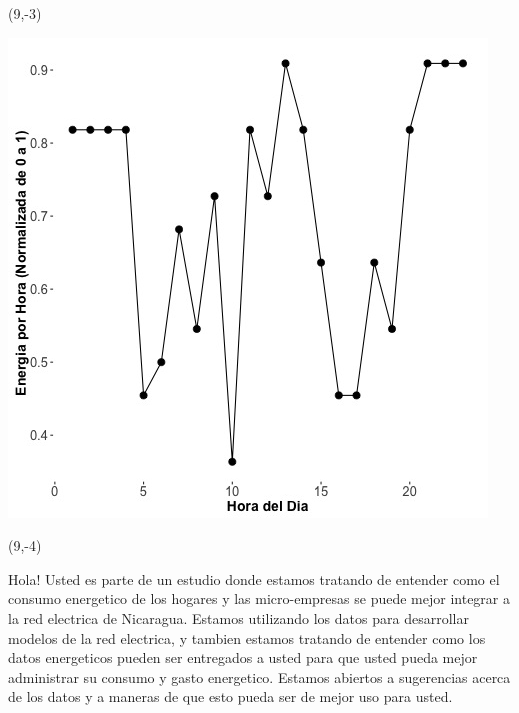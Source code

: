 \documentclass{article}\usepackage[]{graphicx}\usepackage[]{color}
\newenvironment{knitrout}{}{} %
\begin{document}
 \begin{textblock}{1}(9,-3)
\begin{minipage}{20em}
\begingroup

\endgroup
\end{minipage}
\end{textblock}

\begin{knitrout}
\color{fgcolor}
\includegraphics[scale=0.75]{figure/A1_fplot_norm_median} 
\end{knitrout}

 \begin{textblock}{1}(9,-4)
\begin{minipage}{20em}
\begingroup

\endgroup
\end{minipage}
\end{textblock}

\vspace{70px}
\begin{knitrout}
Hola! Usted es parte de un estudio donde estamos tratando de entender como el consumo energetico de los hogares y las micro-empresas se puede mejor integrar a la red electrica de Nicaragua. Estamos utilizando los datos para desarrollar modelos de la red electrica, y tambien estamos tratando de entender como los datos energeticos pueden ser entregados a usted para que usted pueda mejor administrar su consumo y gasto energetico.  Estamos abiertos a sugerencias acerca de los datos y a maneras de que esto pueda ser de mejor uso para usted.
\end{knitrout}
\end{document}
